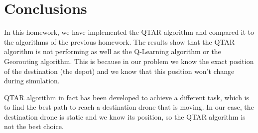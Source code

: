 \section{Conclusions}
In this homework, we have implemented the QTAR algorithm and compared it to the algorithms of the previous homework.
The results show that the QTAR algorithm is not performing as well as the Q-Learning algorithm or the Georouting algorithm.
This is because in our problem we know the exact position of the destination (the depot) and we know that this position won't change during simulation.

QTAR algorithm in fact has been developed to achieve a different task, which is to find the best path to reach a destination drone that is moving.
In our case, the destination drone is static and we know its position, so the QTAR algorithm is not the best choice.